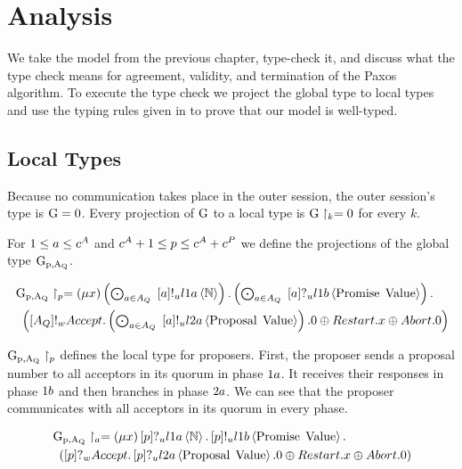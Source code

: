 \chapter{Analysis}
We take the model from the previous chapter, type-check it, and discuss what the type check means for agreement, validity, and termination of the Paxos algorithm.
To execute the type check we project the global type to local types and use the typing rules given in \cite{ftmpst} to prove that our model is well-typed.

\section{Local Types}
Because no communication takes place in the outer session, the  outer session's type is $\operatorname{G} = 0$.
Every projection of $\operatorname{G}$ to a local type is $\operatorname{G} \upharpoonright_{k} = 0$ for every $k$.

For $1 \leq a \leq c^A$ and $c^A + 1 \leq p \leq c^A + c^P$ we define the projections of the global type $\operatorname{G_{p, A_Q}}$.

\begin{align*}
&\operatorname{G_{p, A_Q}} \upharpoonright_{p} = \left(\mu x\right)
\textstyle\left(\bigodot_{a\in A_Q}\;\left[a\right]!_u l1a \left\langle \mathbb{N} \right\rangle\right) .
\textstyle\left(\bigodot_{a\in A_Q}\;\left[a\right]?_u l1b \left\langle \operatorname{Promise}\; \operatorname{Value} \right\rangle\right) .\\
&\hspace*{0.5em * 1}\left(\left[A_Q\right]!_w \mathnormal{Accept} . \textstyle\left(\bigodot_{a\in A_Q}\;\left[a\right]!_u l2a \left\langle \operatorname{Proposal}\; \operatorname{Value} \right\rangle\right).0 \oplus \mathnormal{Restart} . x \oplus \mathnormal{Abort} .0\right)
\end{align*}

$\operatorname{G_{p, A_Q}} \upharpoonright_{p}$ defines the local type for proposers.
First, the proposer sends a proposal number to all acceptors in its quorum in phase $1a$.
It receives their responses in phase $1b$ and then branches in phase $2a$.
We can see that the proposer communicates with all acceptors in its quorum in every phase.

\begin{align*}
&\operatorname{G_{p, A_Q}} \upharpoonright_{a} = \left(\mu x\right)
\left[p\right]?_u l1a \left\langle \mathbb{N} \right\rangle .
\left[p\right]!_u l1b \left\langle \operatorname{Promise}\; \operatorname{Value} \right\rangle .\\
&\hspace*{0.5em * 1}\left(\left[p\right]?_w \mathnormal{Accept} . \left[p\right]?_u l2a \left\langle \operatorname{Proposal}\; \operatorname{Value} \right\rangle.0 \oplus \mathnormal{Restart} . x \oplus \mathnormal{Abort} .0\right)
\end{align*}

